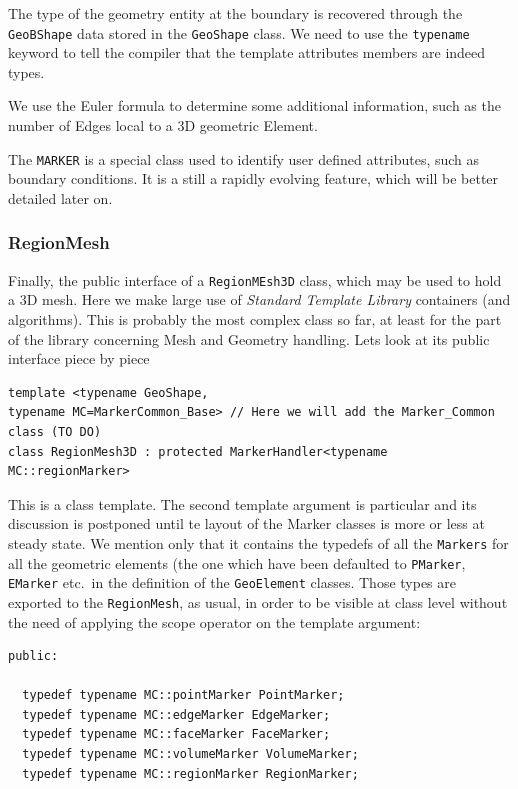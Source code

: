 The type of the geometry entity at the boundary is recovered through
the \texttt{GeoBShape} data stored in the \texttt{GeoShape} class. We
need to use the \texttt{typename} keyword to tell the compiler that
the template attributes members are indeed types.

We use the Euler formula to determine some additional information,
such as the number of Edges local to a 3D geometric Element.

The \texttt{MARKER} is a special class used to identify user defined
attributes, such as boundary conditions. It is a still a rapidly
evolving feature, which will be better detailed later on.
\subsubsection{RegionMesh}
Finally, the public interface of a \texttt{RegionMEsh3D} class, which
may be used to hold a 3D mesh.  Here we make large use of
\emph{Standard Template Library} containers (and algorithms). This is
probably the most complex class so far, at least for the part of the
library concerning Mesh and Geometry handling.
Lets look at its public interface piece by piece

\begin{verbatim}
template <typename GeoShape, 
typename MC=MarkerCommon_Base> // Here we will add the Marker_Common class (TO DO)
class RegionMesh3D : protected MarkerHandler<typename MC::regionMarker>
\end{verbatim}
This is a class template. The second template argument is particular
and its discussion is postponed until te layout of the Marker classes
is more or less at steady state.  We mention only that it contains the
typedefs of all the \texttt{Markers} for all the geometric elements
(the one which have been defaulted to \texttt{PMarker},
\texttt{EMarker} etc.\  in the definition of the \texttt{GeoElement}
classes.  Those types are exported to the \texttt{RegionMesh}, as
usual, in order to be visible at class level without the need of
applying the scope operator on the template argument:
\begin{verbatim}
public:

  typedef typename MC::pointMarker PointMarker;
  typedef typename MC::edgeMarker EdgeMarker;
  typedef typename MC::faceMarker FaceMarker;
  typedef typename MC::volumeMarker VolumeMarker;
  typedef typename MC::regionMarker RegionMarker;
\end{verbatim}

